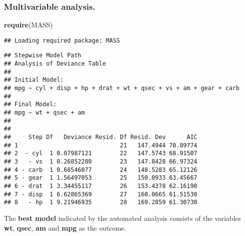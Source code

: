 \documentclass[
]{article}
\newenvironment{Shaded}{\begin{snugshade}}{\end{snugshade}}
\newcommand{\AttributeTok}[1]{\textcolor[rgb]{0.13,0.29,0.53}{#1}}
\newcommand{\ConstantTok}[1]{\textcolor[rgb]{0.56,0.35,0.01}{#1}}
\newcommand{\FunctionTok}[1]{\textcolor[rgb]{0.13,0.29,0.53}{\textbf{#1}}}
\newcommand{\NormalTok}[1]{#1}
\newcommand{\OtherTok}[1]{\textcolor[rgb]{0.56,0.35,0.01}{#1}}
\newcommand{\SpecialCharTok}[1]{\textcolor[rgb]{0.81,0.36,0.00}{\textbf{#1}}}
\newcommand{\StringTok}[1]{\textcolor[rgb]{0.31,0.60,0.02}{#1}}
\begin{document}
\hypertarget{multivariable-analysis.}{%
\subsubsection{Multivariable analysis.}\label{multivariable-analysis.}}

\begin{Shaded}
\begin{Highlighting}[]
\FunctionTok{require}\NormalTok{(MASS)}
\end{Highlighting}
\end{Shaded}

\begin{verbatim}
## Loading required package: MASS
\end{verbatim}

\begin{Shaded}
\end{Shaded}

\begin{verbatim}
## Stepwise Model Path 
## Analysis of Deviance Table
## 
## Initial Model:
## mpg ~ cyl + disp + hp + drat + wt + qsec + vs + am + gear + carb
## 
## Final Model:
## mpg ~ wt + qsec + am
## 
## 
##     Step Df   Deviance Resid. Df Resid. Dev      AIC
## 1                             21   147.4944 70.89774
## 2  - cyl  1 0.07987121        22   147.5743 68.91507
## 3   - vs  1 0.26852280        23   147.8428 66.97324
## 4 - carb  1 0.68546077        24   148.5283 65.12126
## 5 - gear  1 1.56497053        25   150.0933 63.45667
## 6 - drat  1 3.34455117        26   153.4378 62.16190
## 7 - disp  1 6.62865369        27   160.0665 61.51530
## 8   - hp  1 9.21946935        28   169.2859 61.30730
\end{verbatim}

The \textbf{best model} indicated by the automated analysis consists of
the variables \textbf{wt}, \textbf{qsec}, \textbf{am} and \textbf{mpg}
as the outcome.

\begin{Shaded}
\end{Shaded}
\end{document}
